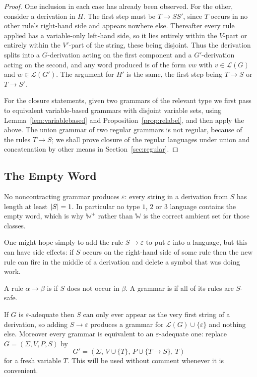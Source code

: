\documentclass[a4paper]{scrartcl}
\newcommand{\WW}{\mathbb{W}}
\newcommand{\lang}{\mathcal{L}}
\newcommand{\eps}{\varepsilon}
\begin{document}
\begin{proof}
	One inclusion in each case has already been observed. For the other, consider a derivation in $H$. The first step must be $T \to SS'$, since $T$ occurs in no other rule's right-hand side and appears nowhere else. Thereafter every rule applied has a variable-only left-hand side, so it lies entirely within the $V$-part or entirely within the $V'$-part of the string, these being disjoint. Thus the derivation splits into a $G$-derivation acting on the first component and a $G'$-derivation acting on the second, and any word produced is of the form $vw$ with $v \in \lang(G)$ and $w \in \lang(G')$. The argument for $H'$ is the same, the first step being $T \to S$ or $T \to S'$.

	For the closure statements, given two grammars of the relevant type we first pass to equivalent variable-based grammars with disjoint variable sets, using Lemma~\ref{lem:variablebased} and Proposition~\ref{prop:relabel}, and then apply the above. The union grammar of two regular grammars is not regular, because of the rules $T \to S$; we shall prove closure of the regular languages under union and concatenation by other means in Section~\ref{sec:regular}.
\end{proof}

\subsection{The Empty Word}

\begin{remark}
	No noncontracting grammar produces $\eps$: every string in a derivation from $S$ has length at least $\lvert S\rvert = 1$. In particular no type $1$, $2$ or $3$ language contains the empty word, which is why $\WW^+$ rather than $\WW$ is the correct ambient set for those classes.
\end{remark}

One might hope simply to add the rule $S \to \eps$ to put $\eps$ into a language, but this can have side effects: if $S$ occurs on the right-hand side of some rule then the new rule can fire in the middle of a derivation and delete a symbol that was doing work.

\begin{definition}
	A rule $\alpha \to \beta$ is  if $S$ does not occur in $\beta$. A grammar is \vocab{$\eps$-adequate} if all of its rules are $S$-safe.
\end{definition}

If $G$ is $\eps$-adequate then $S$ can only ever appear as the very first string of a derivation, so adding $S \to \eps$ produces a grammar for $\lang(G) \cup \{\eps\}$ and nothing else. Moreover every grammar is equivalent to an $\eps$-adequate one: replace $G = (\Sigma, V, P, S)$ by
$$G' = (\Sigma,\, V \cup \{T\},\, P \cup \{T \to S\},\, T)$$
for a fresh variable $T$. This will be used without comment whenever it is convenient.
\end{document}
